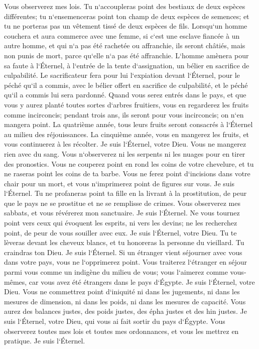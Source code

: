 \verse Vous observerez mes lois. Tu n`accoupleras point des bestiaux de deux espèces différentes; tu n`ensemenceras point ton champ de deux espèces de semences; et tu ne porteras pas un vêtement tissé de deux espèces de fils. 
\verse Lorsqu`un homme couchera et aura commerce avec une femme, si c`est une esclave fiancée à un autre homme, et qui n`a pas été rachetée ou affranchie, ils seront châtiés, mais non punis de mort, parce qu`elle n`a pas été affranchie. 
\verse L`homme amènera pour sa faute à l`Éternel, à l`entrée de la tente d`assignation, un bélier en sacrifice de culpabilité. 
\verse Le sacrificateur fera pour lui l`expiation devant l`Éternel, pour le péché qu`il a commis, avec le bélier offert en sacrifice de culpabilité, et le péché qu`il a commis lui sera pardonné. 
\verse Quand vous serez entrés dans le pays, et que vous y aurez planté toutes sortes d`arbres fruitiers, vous en regarderez les fruits comme incirconcis; pendant trois ans, ils seront pour vous incirconcis; on n`en mangera point. 
\verse La quatrième année, tous leurs fruits seront consacrés à l`Éternel au milieu des réjouissances. 
\verse La cinquième année, vous en mangerez les fruits, et vous continuerez à les récolter. Je suis l`Éternel, votre Dieu. 
\verse Vous ne mangerez rien avec du sang. Vous n`observerez ni les serpents ni les nuages pour en tirer des pronostics. 
\verse Vous ne couperez point en rond les coins de votre chevelure, et tu ne raseras point les coins de ta barbe. 
\verse Vous ne ferez point d`incisions dans votre chair pour un mort, et vous n`imprimerez point de figures sur vous. Je suis l`Éternel. 
\verse Tu ne profaneras point ta fille en la livrant à la prostitution, de peur que le pays ne se prostitue et ne se remplisse de crimes. 
\verse Vous observerez mes sabbats, et vous révérerez mon sanctuaire. Je suis l`Éternel. 
\verse Ne vous tournez point vers ceux qui évoquent les esprits, ni vers les devins; ne les recherchez point, de peur de vous souiller avec eux. Je suis l`Éternel, votre Dieu. 
\verse Tu te lèveras devant les cheveux blancs, et tu honoreras la personne du vieillard. Tu craindras ton Dieu. Je suis l`Éternel. 
\verse Si un étranger vient séjourner avec vous dans votre pays, vous ne l`opprimerez point. 
\verse Vous traiterez l`étranger en séjour parmi vous comme un indigène du milieu de vous; vous l`aimerez comme vous-mêmes, car vous avez été étrangers dans le pays d`Égypte. Je suis l`Éternel, votre Dieu. 
\verse Vous ne commettrez point d`iniquité ni dans les jugements, ni dans les mesures de dimension, ni dans les poids, ni dans les mesures de capacité. 
\verse Vous aurez des balances justes, des poids justes, des épha justes et des hin justes. Je suis l`Éternel, votre Dieu, qui vous ai fait sortir du pays d`Égypte. 
\verse Vous observerez toutes mes lois et toutes mes ordonnances, et vous les mettrez en pratique. Je suis l`Éternel. 

